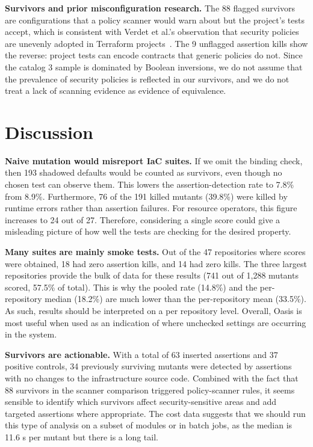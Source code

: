 \documentclass[3p,times,procedia]{elsarticle}
\begin{document}
\textbf{Survivors and prior misconfiguration research.} The 88 flagged survivors are configurations that a policy scanner would warn about but the project's tests accept, which is consistent with Verdet et al.'s observation that security policies are unevenly adopted in Terraform projects~\cite{verdet}. The 9 unflagged assertion kills show the reverse: project tests can encode contracts that generic policies do not. Since the catalog 3 sample is dominated by Boolean inversions, we do not assume that the prevalence of security policies is reflected in our survivors, and we do not treat a lack of scanning evidence as evidence of equivalence.

\section{Discussion}\label{sec:implications}
\textbf{Naive mutation would misreport IaC suites.} If we omit the binding check, then 193 shadowed defaults would be counted as survivors, even though no chosen test can observe them. This lowers the assertion-detection rate to 7.8\% from 8.9\%. Furthermore, 76 of the 191 killed mutants (39.8\%) were killed by runtime errors rather than assertion failures. For resource operators, this figure increases to 24 out of 27. Therefore, considering a single score could give a misleading picture of how well the tests are checking for the desired property.

\textbf{Many suites are mainly smoke tests.} Out of the 47 repositories where scores were obtained, 18 had zero assertion kills, and 14 had zero kills. The three largest repositories provide the bulk of data for these results (741 out of 1,288 mutants scored, 57.5\% of total). This is why the pooled rate (14.8\%) and the per-repository median (18.2\%) are much lower than the per-repository mean (33.5\%). As such, results should be interpreted on a per repository level. Overall, Oasis is most useful when used as an indication of where unchecked settings are occurring in the system.

\textbf{Survivors are actionable.} With a total of 63 inserted assertions and 37 positive controls, 34 previously surviving mutants were detected by assertions with no changes to the infrastructure source code. Combined with the fact that 88 survivors in the scanner comparison triggered policy-scanner rules, it seems sensible to identify which survivors affect security-sensitive areas and add targeted assertions where appropriate. The cost data suggests that we should run this type of analysis on a subset of modules or in batch jobs, as the median is 11.6 s per mutant but there is a long tail.
\end{document}
